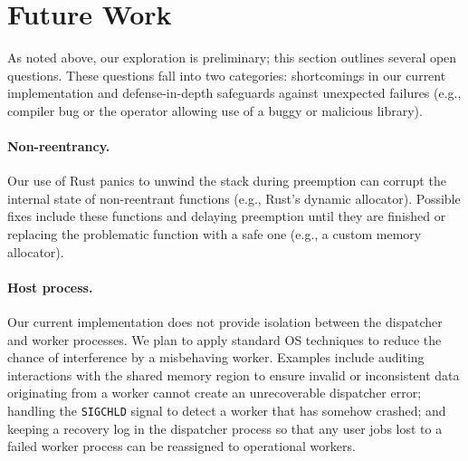\section{Future Work}
\label{sec:future}

As noted above, our exploration is preliminary; this section outlines several
open questions.  These questions fall into two categories: shortcomings in our
current implementation and defense-in-depth safeguards against unexpected
failures (e.g., compiler bug or the operator allowing use of a buggy or malicious library).


\paragraph{Non-reentrancy.}
Our use of Rust panics to unwind the stack during preemption can
corrupt the internal state of non-reentrant functions (e.g., Rust's dynamic
allocator).  Possible fixes include  these functions and delaying
preemption until they are finished or replacing the problematic function with a
safe one (e.g., a custom memory allocator).

\paragraph{Host process.}
Our current implementation does not provide isolation between the dispatcher
and worker processes.  We plan to apply standard OS techniques to reduce
the chance of interference by a misbehaving worker.  Examples
include auditing interactions with the shared memory region to ensure invalid
or inconsistent data originating from a worker cannot create an unrecoverable
dispatcher error; handling the \texttt{SIGCHLD} signal to detect a worker that has
somehow crashed; and keeping a recovery log in the dispatcher process so that any
user jobs lost to a failed worker process can be reassigned to operational
workers.  

